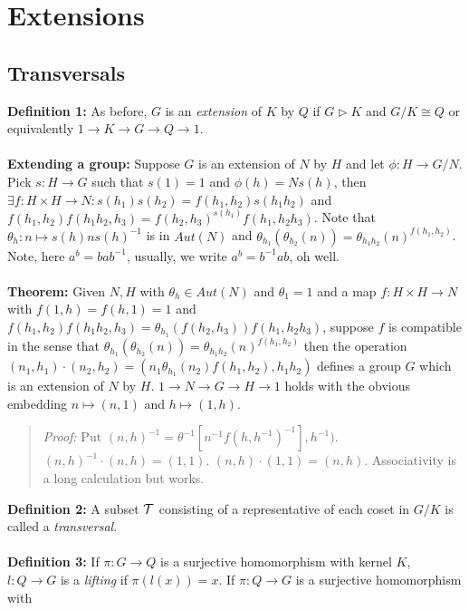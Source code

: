 \chapter{Extensions}
\section {Transversals} 
{\bf Definition 1:}
As before, $G$ is an \emph{extension} of $K$ by $Q$ if $G \triangleright K$ and $G/K \cong Q$
or equivalently $1 \rightarrow K \rightarrow G \rightarrow Q \rightarrow 1$.
\\
\\
{\bf Extending a group:}
Suppose $G$ is an extension of $N$ by $H$ and let $\phi: H \rightarrow G/N$.  Pick
$s:H \rightarrow G$ such that $s(1)=1$ and $\phi(h) = N s(h)$, then 
$\exists f: H \times H \rightarrow N: s(h_1) s(h_2)= f(h_1, h_2) s(h_1 h_2)$
and $f(h_1, h_2) f(h_1 h_2, h_3)= f(h_2, h_3)^{s(h_1)} f(h_1 , h_2 h_3)$.  Note
that $\theta_h: n \mapsto s(h) n s(h)^{-1}$ is in $Aut(N)$ and
$\theta_{h_1}(\theta_{h_2}(n))= \theta_{h_1 h_2}(n)^{f(h_1, h_2)}$.  Note, here $a^b = b a b^{-1}$, usually,
we write $a^b = b ^ {-1} a b$, oh well.
\\
\\
{\bf Theorem:}
Given $N,H$ with $\theta_h \in Aut(N)$ and $\theta_1 = 1$ and a map
$f: H \times H \rightarrow N$ with $f(1,h)=f(h,1)=1$ and
$f(h_1, h_2) f(h_1 h_2 , h_3)= \theta_{h_1}(f(h_2, h_3)) f(h_1, h_2 h_3)$, 
suppose $f$ is compatible in the sense that 
$\theta_{h_1}(\theta_{h_2}(n))= \theta_{h_1h_2}(n)^{f(h_1, h_2)}$ then the
operation $(n_1, h_1) \cdot (n_2, h_2) = (n_1 \theta_{h_1}(n_2) f(h_1, h_2), h_1 h_2)$
defines a group $G$ which is an extension of $N$ by $H$.  
$1 \rightarrow N \rightarrow G \rightarrow H \rightarrow 1$ holds with the obvious
embedding $n \mapsto (n,1)$ and $h \mapsto (1,h)$.
\begin{quote}
\emph{Proof:}  Put $(n,h)^{-1}= \theta^{-1}[n^{-1} f(h,h^{-1})^{-1}], h^{-1})$.
$(n,h)^{-1} \cdot (n,h)= (1,1)$.   $(n,h) \cdot (1,1)= (n,h)$.  Associativity is a long
calculation but works.
\end{quote}
{\bf Definition 2:}
A subset ${\cal T}$ consisting of a representative of each coset
in $G/K$ is called a \emph{transversal}.
\\
\\
{\bf Definition 3:}
If $\pi: G \rightarrow Q$ is a surjective homomorphism with kernel
$K$, $l: Q \rightarrow G$ is a \emph{lifting} if $\pi(l(x))=x$.
If $\pi: Q \rightarrow G$ is a surjective homomorphism with

